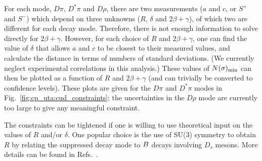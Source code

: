 For each mode, $D\pi$, $D^*\pi$ and $D\rho$, 
there are two measurements ($a$ and $c$, or $S^+$ and $S^-$) 
which depend on three unknowns ($R$, $\delta$ and $2\beta+\gamma$), 
of which two are different for each decay mode. 
Therefore, there is not enough information to solve directly for $2\beta+\gamma$. 
However, for each choice of $R$ and $2\beta+\gamma$, 
one can find the value of $\delta$ that allows $a$ and $c$ to be closest 
to their measured values, 
and calculate the distance in terms of numbers of standard deviations.
(We currently neglect experimental correlations in this analysis.) 
These values of $N(\sigma)_{\rm min}$ can then be plotted 
as a function of $R$ and $2\beta+\gamma$
(and can trivially be converted to confidence levels). 
These plots are given for the $D\pi$ and $D^*\pi$ modes 
in Fig.~\ref{fig:cp_uta:cud_constraints}; 
the uncertainties in the $D\rho$ mode are currently too large 
to give any meaningful constraint.

The constraints can be tightened if one is willing 
to use theoretical input on the values of $R$ and/or $\delta$. 
One popular choice is the use of SU(3) symmetry to obtain 
$R$ by relating the suppressed decay mode to $B$ decays 
involving $D_s$ mesons. 
More details can be found 
in Refs.~\cite{Charles:2004jd,Bona:2005vz}.

